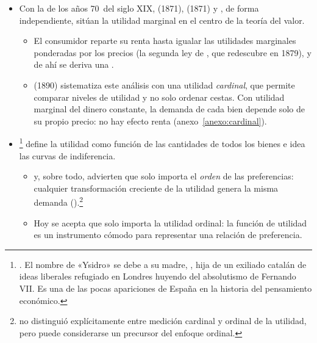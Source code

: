 \documentclass[11pt]{article}
\begin{document}
\begin{itemize}
\begin{itemize}
\begin{itemize}
\begin{enumerate}
      \end{enumerate}
      Algunos manuales añaden una tercera, la \emph{ley de la escasez} (un bien solo tiene valor si es escaso), que  no formula como tal. En el problema del consumidor, la escasez se refleja en que los precios son estrictamente positivos.
    \end{itemize}
  \item Con la  de los años 70~del siglo XIX,  (1871),  (1871) y \textcite{Walras1874Elements}, de forma independiente, sitúan la utilidad marginal en el centro de la teoría del valor.
    \begin{itemize}
    \item El consumidor reparte su renta hasta igualar las utilidades marginales ponderadas por los precios (la segunda ley de , que  redescubre en 1879), y de ahí se deriva una .
    \item {} (1890) sistematiza este análisis con una utilidad \emph{cardinal}, que permite comparar niveles de utilidad y no solo ordenar cestas. Con utilidad marginal del dinero constante, la demanda de cada bien depende solo de su propio precio: no hay efecto renta (anexo~\ref{anexo:cardinal}).
    \end{itemize}
  \item \textcite{Edgeworth1881Mathematical}\footnote{. El nombre de «Ysidro» se debe a su madre, , hija de un exiliado catalán de ideas liberales refugiado en Londres huyendo del absolutismo de Fernando VII\nocite{Barbe2006Edgeworth}. Es una de las pocas apariciones de España en la historia del pensamiento económico.} define la utilidad como función de las cantidades de todos los bienes e idea las curvas de indiferencia.
    \begin{itemize}
    \item \textcite{Fisher1892Mathematical} y, sobre todo, \textcite{Pareto1906Manuale} advierten que solo importa el \emph{orden} de las preferencias: cualquier transformación creciente de la utilidad genera la misma demanda ().\footnote{ no distinguió explícitamente entre medición cardinal y ordinal de la utilidad, pero puede considerarse un precursor del enfoque ordinal.}
    \item Hoy se acepta que solo importa la utilidad ordinal: la función de utilidad es un instrumento cómodo para representar una relación de preferencia.

\end{itemize}
\end{itemize}
\end{itemize}
\end{document}
